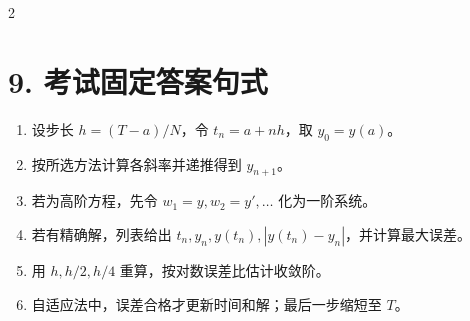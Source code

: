 \documentclass[10pt,a4paper]{ctexart}
\begin{document}
\begin{multicols}{2}
\section*{9. 考试固定答案句式}
\begin{enumerate}
\item 设步长 $h=(T-a)/N$，令 $t_n=a+nh$，取 $y_0=y(a)$。
\item 按所选方法计算各斜率并递推得到 $y_{n+1}$。
\item 若为高阶方程，先令 $w_1=y,w_2=y',\ldots$ 化为一阶系统。
\item 若有精确解，列表给出 $t_n,y_n,y(t_n),|y(t_n)-y_n|$，并计算最大误差。
\item 用 $h,h/2,h/4$ 重算，按对数误差比估计收敛阶。
\item 自适应法中，误差合格才更新时间和解；最后一步缩短至 $T$。
\end{enumerate}

\end{multicols}
\end{document}
